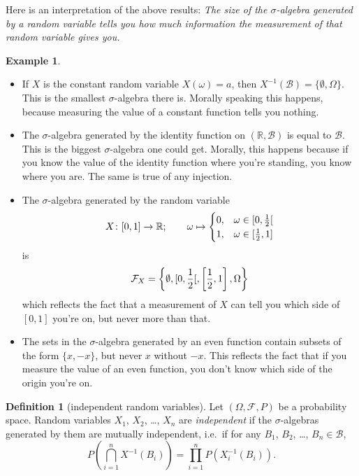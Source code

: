 \documentclass[a4paper,12pt]{scrreprt}
\newcommand{\R}{\mathbb{R}}
\theoremstyle{definition}
\newtheorem{definition}{Definition}[section]
\newtheorem{example}{Example}[section]
\theoremstyle{plain}
\theoremstyle{remark}
\begin{document}
Here is an interpretation of the above results: \emph{The size of the $\sigma$-algebra generated by a random variable tells you how much information the measurement of that random variable gives you.}
\begin{example}
  $\,$
  \begin{itemize}
    \item If $X$ is the constant random variable $X(\omega) = a$, then $X^{-1}(\mathcal{B}) = \{\emptyset, \Omega\}$. This is the smallest $\sigma$-algebra there is. Morally speaking this happens, because measuring the value of a constant function tells you nothing.

    \item The $\sigma$-algebra generated by the identity function on $(\R, \mathcal{B})$ is equal to $\mathcal{B}$. This is the biggest $\sigma$-algebra one could get. Morally, this happens because if you know the value of the identity function where you're standing, you know where you are. The same is true of any injection.

    \item The $\sigma$-algebra generated by the random variable
      \begin{equation*}
        X\colon [0, 1] \to \R;\qquad \omega \mapsto
        \begin{cases}
          0, &\omega \in \interval[open right]{0}{\frac{1}{2}} \\
          1, &\omega \in \interval{\frac{1}{2}}{1}
        \end{cases}
      \end{equation*}
      is
      \begin{equation*}
        \mathcal{F}_{X} = \left\{ \emptyset, \interval[open right]{0}{\frac{1}{2}}, \left[ \frac{1}{2}, 1 \right], \Omega \right\}
      \end{equation*}
      which reflects the fact that a measurement of $X$ can tell you which side of $[0, 1]$ you're on, but never more than that.

    \item The sets in the $\sigma$-algebra generated by an even function contain subsets of the form $\{x, -x\}$, but never $x$ without $-x$. This reflects the fact that if you measure the value of an even function, you don't know which side of the origin you're on.
  \end{itemize}
\end{example}

\begin{definition}[independent random variables]
  \label{def:independentrandomvariables}
  Let $(\Omega, \mathcal{F}, P)$ be a probability space. Random variables $X_{1}$, $X_{2}$, \ldots, $X_{n}$ are \emph{independent} if the $\sigma$-algebras generated by them are mutually independent, i.e.\ if for any $B_{1}$, $B_{2}$, \ldots, $B_{n} \in \mathcal{B}$,
  \begin{equation*}
    P\left( \bigcap_{i = 1}^{n} X^{-1}(B_{i}) \right) = \prod_{i = 1}^{n} P(X_{i}^{-1}(B_{i})).
  \end{equation*}
\end{definition}
\end{document}
